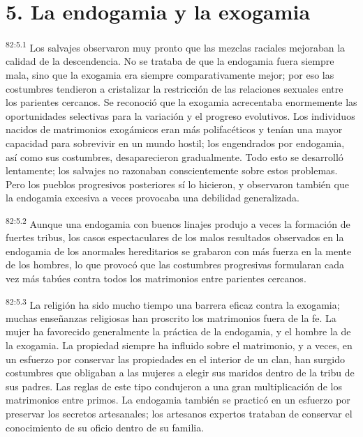 \section*{5. La endogamia y la exogamia}
\par
\textsuperscript{82:5.1} Los salvajes observaron muy pronto que las mezclas raciales mejoraban la calidad de la descendencia. No se trataba de que la endogamia fuera siempre mala, sino que la exogamia era siempre comparativamente mejor; por eso las costumbres tendieron a cristalizar la restricción de las relaciones sexuales entre los parientes cercanos. Se reconoció que la exogamia acrecentaba enormemente las oportunidades selectivas para la variación y el progreso evolutivos. Los individuos nacidos de matrimonios exogámicos eran más polifacéticos y tenían una mayor capacidad para sobrevivir en un mundo hostil; los engendrados por endogamia, así como sus costumbres, desaparecieron gradualmente. Todo esto se desarrolló lentamente; los salvajes no razonaban conscientemente sobre estos problemas. Pero los pueblos progresivos posteriores sí lo hicieron, y observaron también que la endogamia excesiva a veces provocaba una debilidad generalizada.

\par
\textsuperscript{82:5.2} Aunque una endogamia con buenos linajes produjo a veces la formación de fuertes tribus, los casos espectaculares de los malos resultados observados en la endogamia de los anormales hereditarios se grabaron con más fuerza en la mente de los hombres, lo que provocó que las costumbres progresivas formularan cada vez más tabúes contra todos los matrimonios entre parientes cercanos.

\par
\textsuperscript{82:5.3} La religión ha sido mucho tiempo una barrera eficaz contra la exogamia; muchas enseñanzas religiosas han proscrito los matrimonios fuera de la fe. La mujer ha favorecido generalmente la práctica de la endogamia, y el hombre la de la exogamia. La propiedad siempre ha influido sobre el matrimonio, y a veces, en un esfuerzo por conservar las propiedades en el interior de un clan, han surgido costumbres que obligaban a las mujeres a elegir sus maridos dentro de la tribu de sus padres. Las reglas de este tipo condujeron a una gran multiplicación de los matrimonios entre primos. La endogamia también se practicó en un esfuerzo por preservar los secretos artesanales; los artesanos expertos trataban de conservar el conocimiento de su oficio dentro de su familia.

